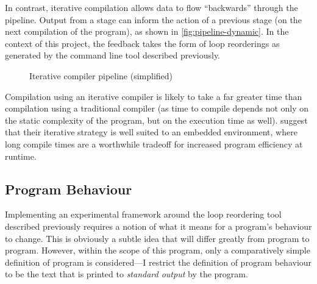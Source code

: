 \documentclass[journal]{IEEEtran}
\begin{document}
In contrast, iterative compilation allows data to flow ``backwards'' through the
pipeline. Output from a stage can inform the action of a previous stage (on the
next compilation of the program), as shown in \autoref{fig:pipeline-dynamic}. In
the context of this project, the feedback takes the form of loop reorderings as
generated by the command line tool described previously.

\begin{figure}[h] 
  \centering 
  \caption{Iterative compiler pipeline (simplified)} 
  \label{fig:pipeline-dynamic}
\end{figure}

Compilation using an iterative compiler is likely to take a far greater time
than compilation using a traditional compiler (as time to compile depends not
only on the static complexity of the program, but on the execution time as
well). \textcite{fursin_evaluating_2002} suggest that their iterative strategy
is well suited to an embedded environment, where long compile times are a
worthwhile tradeoff for increased program efficiency at runtime.

\subsection{Program Behaviour} \label{ssec:behaviour}

Implementing an experimental framework around the loop reordering tool described
previously requires a notion of what it means for a program's behaviour to
change. This is obviously a subtle idea that will differ greatly from program to
program. However, within the scope of this program, only a comparatively simple
definition of program is considered---I restrict the definition of program
behaviour to be the text that is printed to \emph{standard output} by the
program.
\end{document}

